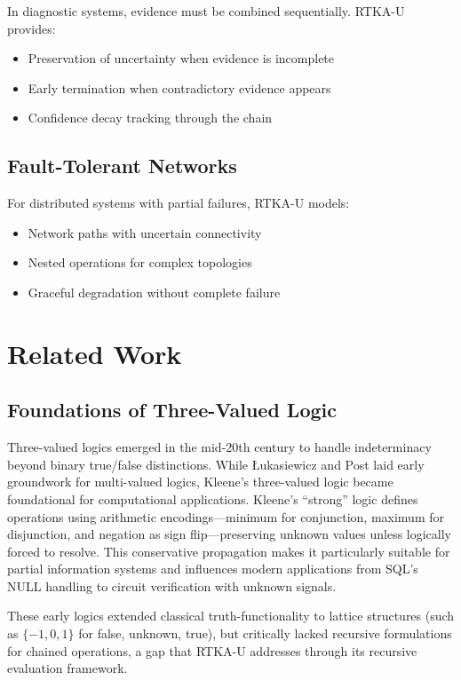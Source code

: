 \documentclass[11pt,a4paper]{article}
\begin{document}
In diagnostic systems, evidence must be combined sequentially. RTKA-U provides:

\begin{itemize}
\item Preservation of uncertainty when evidence is incomplete
\item Early termination when contradictory evidence appears
\item Confidence decay tracking through the chain
\end{itemize}

\subsection{Fault-Tolerant Networks}

For distributed systems with partial failures, RTKA-U models:

\begin{itemize}
\item Network paths with uncertain connectivity
\item Nested operations for complex topologies
\item Graceful degradation without complete failure
\end{itemize}

\section{Related Work}

\subsection{Foundations of Three-Valued Logic}

Three-valued logics emerged in the mid-20th century to handle indeterminacy beyond binary true/false distinctions. While Łukasiewicz \cite{lukasiewicz1920} and Post \cite{post1921} laid early groundwork for multi-valued logics, Kleene's three-valued logic \cite{kleene1952} became foundational for computational applications. Kleene's ``strong'' logic defines operations using arithmetic encodings—minimum for conjunction, maximum for disjunction, and negation as sign flip—preserving unknown values unless logically forced to resolve. This conservative propagation makes it particularly suitable for partial information systems and influences modern applications from SQL's NULL handling to circuit verification with unknown signals.

These early logics extended classical truth-functionality to lattice structures (such as $\{-1, 0, 1\}$ for false, unknown, true), but critically lacked recursive formulations for chained operations, a gap that RTKA-U addresses through its recursive evaluation framework.
\end{document}

